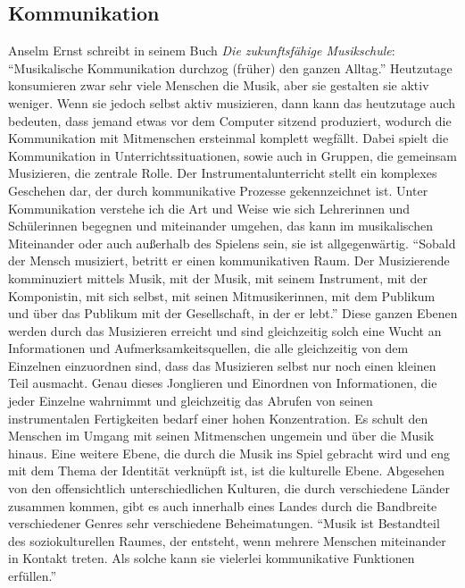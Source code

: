 \subsection{Kommunikation}
Anselm Ernst schreibt in seinem Buch \emph{Die zukunftsfähige Musikschule}:
\enquote{Musikalische Kommunikation durchzog (früher) den ganzen Alltag.}
\autocite[37]{ernst:die_zukunftsfaehige_musikschule} Heutzutage konsumieren zwar
sehr viele Menschen die Musik, aber sie gestalten sie aktiv weniger. Wenn sie
jedoch selbst aktiv musizieren, dann kann das heutzutage auch bedeuten, dass
jemand etwas vor dem Computer sitzend produziert, wodurch die Kommunikation mit
Mitmenschen ersteinmal komplett wegfällt. Dabei spielt die Kommunikation in
Unterrichtssituationen, sowie auch in Gruppen, die gemeinsam Musizieren, die
zentrale Rolle. Der Instrumentalunterricht stellt ein komplexes Geschehen dar,
der durch kommunikative Prozesse gekennzeichnet ist. Unter Kommunikation
verstehe ich die Art und Weise wie sich Lehrerinnen und Schülerinnen begegnen und
miteinander umgehen, das kann im musikalischen Miteinander oder auch außerhalb
des Spielens sein, sie ist allgegenwärtig. \enquote{Sobald der Mensch musiziert, betritt
er einen kommunikativen Raum. Der Musizierende komminuziert mittels Musik, mit
der Musik, mit seinem Instrument, mit der Komponistin, mit sich selbst, mit
seinen Mitmusikerinnen, mit dem Publikum und über das Publikum mit der Gesellschaft,
in der er lebt.} \autocite[56]{doerne:umfassend_musizieren} Diese ganzen Ebenen
werden durch das Musizieren erreicht und sind gleichzeitig solch eine Wucht an
Informationen und Aufmerksamkeitsquellen, die alle gleichzeitig von dem Einzelnen einzuordnen sind, dass
das Musizieren selbst nur noch einen kleinen Teil ausmacht. Genau dieses
Jonglieren und Einordnen von Informationen, die jeder Einzelne wahrnimmt und
gleichzeitig das Abrufen von seinen instrumentalen Fertigkeiten bedarf einer
hohen Konzentration. Es schult den Menschen im Umgang mit seinen Mitmenschen
ungemein und über die Musik hinaus. Eine weitere Ebene, die durch die Musik ins
Spiel gebracht wird und eng mit dem Thema der Identität verknüpft ist, ist die
kulturelle Ebene. Abgesehen von den offensichtlich unterschiedlichen Kulturen,
die durch verschiedene Länder zusammen kommen, gibt es auch innerhalb eines
Landes durch die Bandbreite verschiedener Genres sehr verschiedene
Beheimatungen. \enquote{Musik ist Bestandteil des soziokulturellen Raumes, der entsteht,
wenn mehrere Menschen miteinander in Kontakt treten. Als solche kann sie
vielerlei kommunikative Funktionen erfüllen.}

